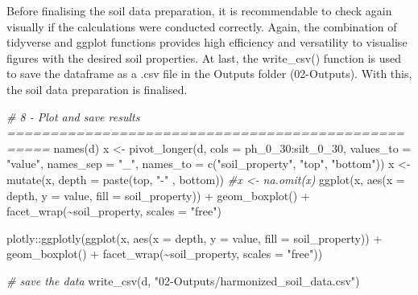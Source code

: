 \documentclass[
  10pt,
  b5paper,
  oneside]{book}
\newenvironment{Shaded}{\begin{snugshade}}{\end{snugshade}}
\newcommand{\AttributeTok}[1]{\textcolor[rgb]{0.77,0.63,0.00}{#1}}
\newcommand{\CommentTok}[1]{\textcolor[rgb]{0.56,0.35,0.01}{\textit{#1}}}
\newcommand{\FunctionTok}[1]{\textcolor[rgb]{0.00,0.00,0.00}{#1}}
\newcommand{\NormalTok}[1]{#1}
\newcommand{\OtherTok}[1]{\textcolor[rgb]{0.56,0.35,0.01}{#1}}
\newcommand{\SpecialCharTok}[1]{\textcolor[rgb]{0.00,0.00,0.00}{#1}}
\newcommand{\StringTok}[1]{\textcolor[rgb]{0.31,0.60,0.02}{#1}}
\begin{document}
Before finalising the soil data preparation, it is recommendable to check again visually if the calculations were conducted correctly. Again, the combination of tidyverse and ggplot functions provides high efficiency and versatility to visualise figures with the desired soil properties. At last, the write\_csv() function is used to save the dataframe as a .csv file in the Outputs folder (02-Outputs). With this, the soil data preparation is finalised.

\begin{Shaded}
\begin{Highlighting}[]
\CommentTok{\# 8 {-} Plot  and save results ===================================================}
\FunctionTok{names}\NormalTok{(d)}
\NormalTok{x }\OtherTok{\textless{}{-}} \FunctionTok{pivot\_longer}\NormalTok{(d, }\AttributeTok{cols =}\NormalTok{ ph\_0\_30}\SpecialCharTok{:}\NormalTok{silt\_0\_30, }\AttributeTok{values\_to =} \StringTok{"value"}\NormalTok{,}
                  \AttributeTok{names\_sep =} \StringTok{"\_"}\NormalTok{, }
                  \AttributeTok{names\_to =} \FunctionTok{c}\NormalTok{(}\StringTok{"soil\_property"}\NormalTok{, }\StringTok{"top"}\NormalTok{, }\StringTok{"bottom"}\NormalTok{))}
\NormalTok{x }\OtherTok{\textless{}{-}} \FunctionTok{mutate}\NormalTok{(x, }\AttributeTok{depth =} \FunctionTok{paste}\NormalTok{(top, }\StringTok{"{-}"}\NormalTok{ , bottom))}
\CommentTok{\#x \textless{}{-} na.omit(x)}
\FunctionTok{ggplot}\NormalTok{(x, }\FunctionTok{aes}\NormalTok{(}\AttributeTok{x =}\NormalTok{ depth, }\AttributeTok{y =}\NormalTok{ value, }\AttributeTok{fill =}\NormalTok{ soil\_property)) }\SpecialCharTok{+}
  \FunctionTok{geom\_boxplot}\NormalTok{() }\SpecialCharTok{+} 
  \FunctionTok{facet\_wrap}\NormalTok{(}\SpecialCharTok{\textasciitilde{}}\NormalTok{soil\_property, }\AttributeTok{scales =} \StringTok{"free"}\NormalTok{)}


\NormalTok{plotly}\SpecialCharTok{::}\FunctionTok{ggplotly}\NormalTok{(}\FunctionTok{ggplot}\NormalTok{(x, }\FunctionTok{aes}\NormalTok{(}\AttributeTok{x =}\NormalTok{ depth, }\AttributeTok{y =}\NormalTok{ value, }\AttributeTok{fill =}\NormalTok{ soil\_property)) }\SpecialCharTok{+}
           \FunctionTok{geom\_boxplot}\NormalTok{() }\SpecialCharTok{+} 
           \FunctionTok{facet\_wrap}\NormalTok{(}\SpecialCharTok{\textasciitilde{}}\NormalTok{soil\_property, }\AttributeTok{scales =} \StringTok{"free"}\NormalTok{))}

\CommentTok{\# save the data}
\FunctionTok{write\_csv}\NormalTok{(d, }\StringTok{"02{-}Outputs/harmonized\_soil\_data.csv"}\NormalTok{)}
\end{Highlighting}
\end{Shaded}
\end{document}
